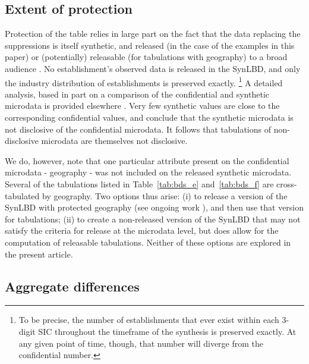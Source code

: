 \subsection{Extent of protection}
\label{sec:protection}

Protection of the table relies in large part on the fact that the data replacing the suppressions is 
itself synthetic, and released (in the case of the examples in this paper) or (potentially) 
releasable (for tabulations with geography) to a broad audience \cite{AbowdVilhuber2010}. No 
establishment's observed data is released in the SynLBD, and only the industry distribution of 
establishments is preserved exactly.%
%
\footnote{To be precise, the number of establishments that ever exist within each 3-digit 
\ac{SIC} throughout the timeframe of the synthesis is preserved exactly. At any given point of 
time, though, that number will diverge from the confidential number. }
%
 A detailed analysis, based in part on a comparison of the 
confidential and synthetic microdata is 
provided elsewhere \cite{KinneyEtAl2011}. Very few synthetic values are close to the 
corresponding confidential values, and \cite{KinneyEtAl2011} conclude that the synthetic 
microdata is not disclosive of the confidential microdata. It follows that tabulations of 
non-disclosive microdata are themselves not disclosive.

We do, however, note that one particular attribute present on the confidential microdata - 
geography - was not included on the released synthetic microdata. Several of the tabulations 
listed in Table~\ref{tab:bds_e} and~\ref{tab:bds_f} are cross-tabulated by geography. Two 
options thus arise: (i) to release a version of the SynLBD with protected geography (see 
ongoing work \cite{KinneyEtAl2013}), and then use that version for tabulations; (ii) to 
create a non-released version of the SynLBD that may not satisfy the criteria for release at the microdata level, but does allow for the computation of releasable tabulations. Neither of these options are explored in the present article.

\subsection{Aggregate differences}

